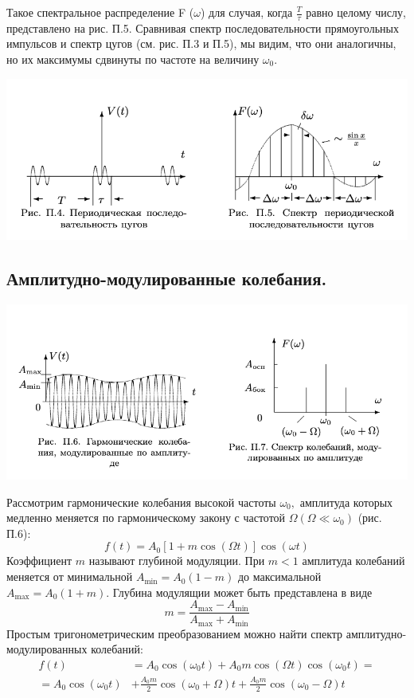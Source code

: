 \documentclass[a4paper, 12pt]{article}%
\begin{document}
Такое спектральное распределение F ($\omega$) для случая, когда $\frac T\tau$ равно целому числу, представлено на рис. П.5. Сравнивая спектр последовательности прямоугольных импульсов и спектр цугов (см. рис. П.3 и П.5), мы видим, что они аналогичны, но их максимумы сдвинуты по частоте на величину $\omega_0$.

\begin{center}
\includegraphics[width=0.7\linewidth]{./anat/3.jpg}\\
\end{center}

\subsection{Амплитудно-модулированные колебания.}

\begin{center}
\includegraphics[width=0.7\linewidth]{./anat/4.jpg}\\
\end{center}
 Рассмотрим гармонические колебания высокой частоты $\omega_{0},$ амплитуда которых медленно меняется по гармоническому закону с частотой $\Omega\left(\Omega \ll \omega_{0}\right)$ (рис. П.6):
$$
f(t)=A_{0}[1+m \cos (\Omega t)] \cos (\omega t)
$$
Коэффициент $m$ называют глубиной модуляции. При $m<1$ амплитуда колебаний меняется от минимальной $A_{\min }=A_{0}(1-m)$ до максимальной $A_{\max }=A_{0}(1+m) .$ Глубина модулящии может быть представлена в виде
$$
m=\frac{A_{\max }-A_{\min }}{A_{\max }+A_{\min }}
$$
Простым тригонометрическим преобразованием можно найти спектр амплитудно-модулированных колебаний:
$$
\begin{aligned}
f(t) &=A_{0} \cos \left(\omega_{0} t\right)+A_{0} m \cos (\Omega t) \cos \left(\omega_{0} t\right)=\\
=A_{0} \cos \left(\omega_{0} t\right) &+\frac{A_{0} m}{2} \cos \left(\omega_{0}+\Omega\right) t+\frac{A_{0} m}{2} \cos \left(\omega_{0}-\Omega\right) t
\end{aligned}
$$
\end{document}
